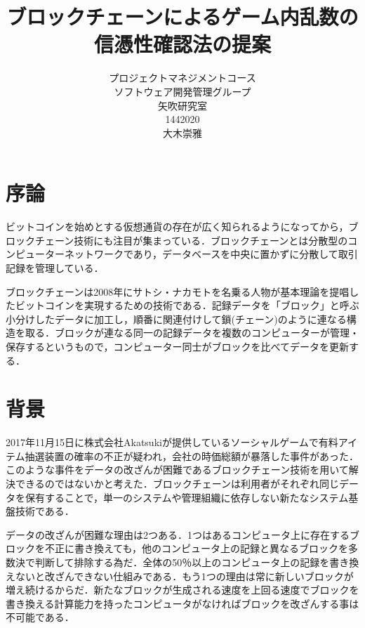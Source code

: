 
\title{ブロックチェーンによるゲーム内乱数の\\
信憑性確認法の提案}
\author{プロジェクトマネジメントコース\\
ソフトウェア開発管理グループ\\
矢吹研究室\\
1442020\\
大木崇雅}
\date{}



\maketitle


\tableofcontents%


\chapter{序論}

ビットコインを始めとする仮想通貨の存在が広く知られるようになってから，ブロックチェーン技術にも注目が集まっている．ブロックチェーンとは分散型のコンピューターネットワークであり，データベースを中央に置かずに分散して取引記録を管理している\cite{a}．

ブロックチェーンは2008年にサトシ・ナカモトを名乗る人物が基本理論を提唱したビットコインを実現するための技術である．記録データを「ブロック」と呼ぶ小分けしたデータに加工し，順番に関連付けして鎖(チェーン)のように連なる構造を取る．ブロックが連なる同一の記録データを複数のコンピューターが管理・保存するというもので，コンピューター同士がブロックを比べてデータを更新する．



\chapter{背景}

2017年11月15日に株式会社Akatsukiが提供しているソーシャルゲームで有料アイテム抽選装置の確率の不正が疑われ，会社の時価総額が暴落した事件があった．このような事件をデータの改ざんが困難であるブロックチェーン技術を用いて解決できるのではないかと考えた．ブロックチェーンは利用者がそれぞれ同じデータを保有することで，単一のシステムや管理組織に依存しない新たなシステム基盤技術である．

データの改ざんが困難な理由は2つある．1つはあるコンピュータ上に存在するブロックを不正に書き換えても，他のコンピュータ上の記録と異なるブロックを多数決で判断して排除する為だ．全体の50％以上のコンピュータ上の記録を書き換えないと改ざんできない仕組みである\cite{c}．もう1つの理由は常に新しいブロックが増え続けるからだ．新たなブロックが生成される速度を上回る速度でブロックを書き換える計算能力を持ったコンピュータがなければブロックを改ざんする事は不可能である．

